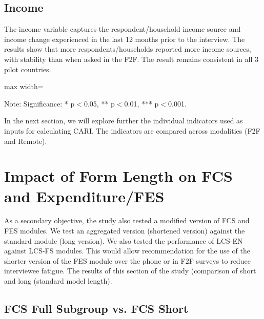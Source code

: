 \documentclass[11pt,harvard]{article}
\begin{document}
\pagebreak

\subsection{Income}

The income variable captures the respondent/household income source and income change experienced in the last 12 months prior to the interview. The results show that more respondents/households reported more income sources, with stability than when asked in the F2F. The result remains consistent in all 3 pilot countries.   

\begin{table}[htbp]
	\centering
	\begin{adjustbox}{max width=\textwidth}
		\begin{threeparttable}
			\caption{Impact of Survey Modality on Income}
			\scriptsize
			 
			\label{tab:INC_Modality_All_Country}
			\begin{tablenotes}
				\item Note: Significance: * p$<$0.05, ** p$<$0.01, *** p$<$0.001. 
			\end{tablenotes}
		\end{threeparttable}
	\end{adjustbox}
\end{table}

In the next section, we will explore further the individual indicators used as inputs for calculating CARI. The indicators are compared across modalities (F2F and Remote).

\pagebreak
	
\section{Impact of Form Length on FCS and Expenditure/FES}

As a secondary objective, the study also tested a modified version of FCS and FES modules. We test an aggregated version (shortened version) against the standard module (long version). We also tested the performance of LCS-EN against LCS-FS modules. This would allow recommendation for the use of the shorter version of the FES module over the phone or in F2F surveys to reduce interviewee fatigue. The results of this section of the study (comparison of short and long (standard model length). 

\subsection{FCS Full Subgroup vs. FCS Short}
\end{document}
